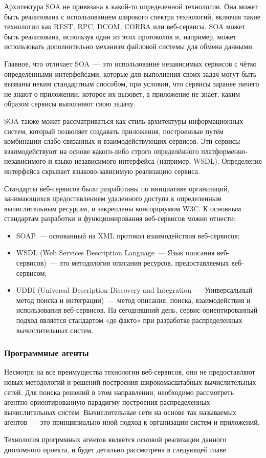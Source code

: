 Архитектура SOA не привязана к какой-то определенной технологии. Она может быть реализована с использованием широкого спектра технологий, включая такие технологии как REST, RPC, DCOM, CORBA или веб-сервисы. SOA может быть реализована, используя один из этих протоколов и, например, может использовать дополнительно механизм файловой системы для обмена данными.

Главное, что отличает SOA~--- это использование независимых сервисов с чётко определёнными интерфейсами, которые для выполнения своих задач могут быть вызваны неким стандартным способом, при условии, что сервисы заранее ничего не знают о приложении, которое их вызовет, а приложение не знает, каким образом сервисы выполняют свою задачу.

SOA также может рассматриваться как стиль архитектуры информационных систем, который позволяет создавать приложения, построенные путём комбинации слабо-связанных и взаимодействующих сервисов. Эти сервисы взаимодействуют на основе какого-либо строго определённого платформенно-независимого и языко-независимого интерфейса (например, WSDL). Определение интерфейса скрывает языково-зависимую реализацию сервиса.

Стандарты веб-сервисов были разработаны по инициативе организаций, занимающихся предоставлением удаленного доступа к определенным вычислительным ресурсам, и закреплены консорциумом W3C. К основным стандартам разработки и функционирования веб-сервисов можно отнести:
\begin{itemize}
\item SOAP~--- основанный на XML протокол взаимодействия веб-сервисов;
\item WSDL (Web Services Description Language~--- Язык описания веб-сервисов)~--- это методология описания ресурсов, предоставляемых веб-сервисом;
\item UDDI (Universal Description Discovery and Integration~--- Универсальный метод поиска и интеграции)~--- метод описания, поиска, взаимодействия и использования веб-сервисов. На сегодняшний день, сервис-ориентированный подход является стандартом «де-факто» при разработке распределенных вычислительных систем.
\end{itemize}

\subsubsection{Программные агенты}
Несмотря на все преимущества технологии веб-сервисов, они не предоставляют новых методологий и решений построения широкомасштабных вычислительных сетей. Для поиска решений в этом направлении, необходимо рассмотреть агентно-ориентированную парадигму построения распределенных вычислительных систем. Вычислительные сети на основе так называемых агентов~--- это принципиально иной подход к организации систем и приложений.

Технология прогрммных агентов является основой реализации данного дипломного проекта, и будет детально рассмотрена в следующей главе.
